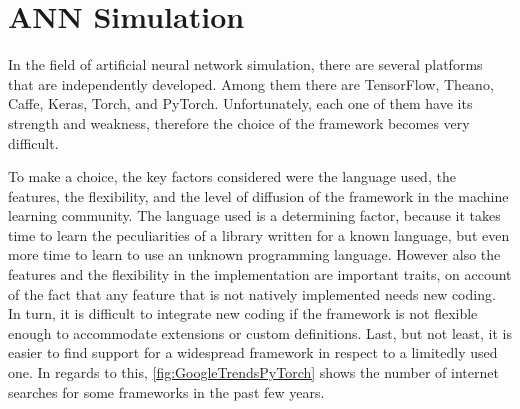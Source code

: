 %


\section{ANN Simulation}
\label{sec:ANN_Simulation}
In the field of artificial neural network simulation, there are several platforms that are independently developed.
Among them there are TensorFlow, Theano, Caffe, Keras, Torch, and PyTorch.
Unfortunately, each one of them have its strength and weakness, therefore the choice of the framework becomes very difficult.

To make a choice, the key factors considered were the language used, the features, the flexibility, and the level of diffusion of the framework in the machine learning community.
The language used is a determining factor, because it takes time to learn the peculiarities of a library written for a known language, but even more time to learn to use an unknown programming language.
However also the features and the flexibility in the implementation are important traits, on account of the fact that any feature that is not natively implemented needs new coding.
In turn, it is difficult to integrate new coding if the framework is not flexible enough to accommodate extensions or custom definitions.
Last, but not least, it is easier to find support for a widespread framework in respect to a limitedly used one.
In regards to this, \autoref{fig:GoogleTrendsPyTorch} shows the number of internet searches for some frameworks in the past few years.

